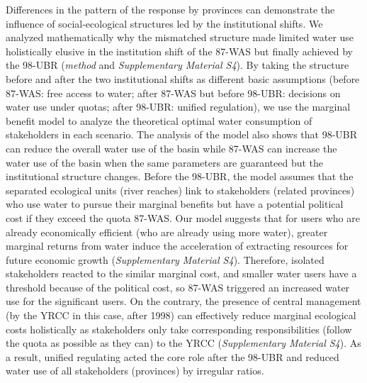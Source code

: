 {%
\label{discussion-2}
Differences in the pattern of the response by provinces can demonstrate the influence of social-ecological structures led by the institutional shifts.
We analyzed mathematically why the mismatched structure made limited water use holistically elusive in the institution shift of the 87-WAS but finally achieved by the 98-UBR (\textit{method} and \textit{Supplementary Material S4}).
By taking the structure before and after the two institutional shifts as different basic assumptions (before 87-WAS: free access to water; after 87-WAS but before 98-UBR: decisions on water use under quotas; after 98-UBR: unified regulation), we use the marginal benefit model to analyze the theoretical optimal water consumption of stakeholders in each scenario.
The analysis of the model also shows that 98-UBR can reduce the overall water use of the basin while 87-WAS can increase the water use of the basin when the same parameters are guaranteed but the institutional structure changes.
Before the 98-UBR, the model assumes that the separated ecological units (river reaches) link to stakeholders (related provinces) who use water to pursue their marginal benefits but have a potential political cost if they exceed the quota 87-WAS.
Our model suggests that for users who are already economically efficient (who are already using more water), greater marginal returns from water induce the acceleration of extracting resources for future economic growth (\textit{Supplementary Material S4}).
Therefore, isolated stakeholders reacted to the similar marginal cost, and smaller water users have a threshold because of the political cost, so 87-WAS triggered an increased water use for the significant users.
On the contrary, the presence of central management (by the YRCC in this case, after 1998) can effectively reduce marginal ecological costs holistically as stakeholders only take corresponding responsibilities (follow the quota as possible as they can) to the YRCC (\textit{Supplementary Material S4}).
As a result, unified regulating acted the core role after the 98-UBR and reduced water use of all stakeholders (provinces) by irregular ratios.

}
